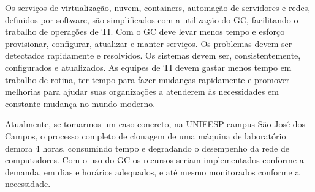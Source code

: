 \documentclass[quali]{mpit}
\begin{document}
Os serviços de virtualização, nuvem, containers, automação de servidores e  redes, definidos por software, são simplificados com a utilização do GC, facilitando o trabalho de operações de TI. Com o GC deve levar menos tempo e esforço  provisionar, configurar, atualizar e manter serviços. Os problemas devem ser detectados rapidamente e resolvidos. Os sistemas devem ser, consistentemente, configurados e atualizados. As equipes de TI devem gastar menos tempo em trabalho de rotina, ter tempo para fazer mudanças rapidamente e promover melhorias para ajudar suas organizações a atenderem às necessidades em constante mudança no mundo moderno.

Atualmente, se tomarmos um caso concreto, na UNIFESP campus São José dos Campos, o processo completo de clonagem de uma máquina de laboratório demora 4 horas, consumindo tempo e degradando o desempenho da rede de computadores. Com o uso do GC os recursos seriam implementados conforme a demanda, em dias e horários adequados, e até mesmo monitorados conforme a necessidade. 
\end{document}

